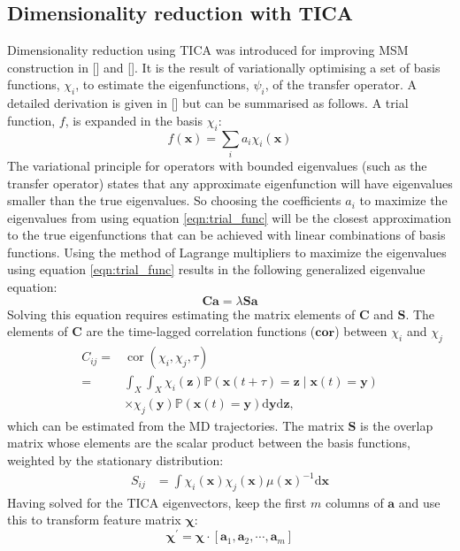 \subsection{Dimensionality reduction with TICA}

Dimensionality reduction using TICA was introduced for improving MSM construction in [] and []. It is the result of variationally optimising a set of basis functions, $\chi_{i}$, to estimate the eigenfunctions, $\psi_{i}$, of the transfer operator. A detailed derivation is given in [] but can be summarised as follows. A trial function, $f$, is expanded in the basis $\chi_{i}$: 
\begin{equation}\label{eqn:trial_func}
    f(\mathbf{x}) = \sum_{i}a_{i}\chi_{i}(\mathbf{x})
\end{equation}
The variational principle for operators with bounded eigenvalues (such as the transfer operator) states that any approximate eigenfunction will have eigenvalues smaller than the true eigenvalues. So choosing the coefficients $a_{i}$ to maximize the eigenvalues from using equation \ref{eqn:trial_func} will be the closest approximation to the true eigenfunctions that can be achieved with linear combinations of basis functions. Using the method of Lagrange multipliers to maximize the eigenvalues using equation \ref{eqn:trial_func} results in the following generalized eigenvalue equation: \begin{equation}\label{eqn:general_ev_equation}
    \mathbf{C}\mathbf{a} = \lambda \mathbf{S}\mathbf{a}
\end{equation}
Solving this equation requires estimating the matrix elements of $\mathbf{C}$ and $\mathbf{S}$. The elements of $\mathbf{C}$ are the time-lagged correlation functions ($\mathbf{cor}$) between $\chi_{i}$ and $\chi_{j}$
\begin{equation}
    \begin{split}
        C_{ij} =& \operatorname{cor}\left(\chi_{i}, \chi_{j}, \tau\right)\\
        =& \int_{X} \int_{X} \chi_{i}(\mathbf{z}) \mathbb{P}\left(\mathbf{x}(t+\tau)=\mathbf{z} \mid \mathbf{x}(t)=\mathbf{y}\right) \\
        & \times \chi_{j}(\mathbf{y}) \mathbb{P}\left(\mathbf{x}(t)=\mathbf{y}\right) \mathrm{d} \mathbf{y} \mathrm{d}\mathbf{z},        
    \end{split}
\end{equation}
which can be estimated from the MD trajectories. The matrix $\mathbf{S}$ is the overlap matrix whose elements are the scalar product between the basis functions, weighted by the stationary distribution: 
\begin{align}
    S_{ij} &= \int \chi_{i}(\mathbf{x})\chi_{j}(\mathbf{x})\mu(\mathbf{x})^{-1} \mathrm{d}\mathbf{x}
\end{align}
Having solved for the TICA eigenvectors, keep the first $m$ columns of $\mathbf{a}$ and use this to transform feature matrix $\bm{\chi}$: 
\begin{equation}
    \bm{\chi}^{\prime} = \bm{\chi}\cdot[\mathbf{a}_{1}, \mathbf{a}_{2}, \cdots,  \mathbf{a}_{m}]
\end{equation}

